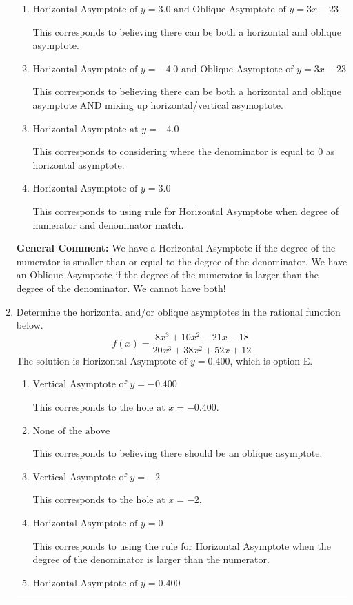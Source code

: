 \documentclass{extbook}[14pt]
\newcommand{\litem}[1]{\item #1

\rule{\textwidth}{0.4pt}}
\begin{document}
\begin{enumerate}
{\begin{enumerate}[label=\Alph*.]
This is the correct answer.
\item \( \text{Horizontal Asymptote of } y = 3.0 \text{ and Oblique Asymptote of } y = 3x -23 \)

This corresponds to believing there can be both a horizontal and oblique asymptote.
\item \( \text{Horizontal Asymptote of } y = -4.0 \text{ and Oblique Asymptote of } y = 3x -23 \)

This corresponds to believing there can be both a horizontal and oblique asymptote AND mixing up horizontal/vertical asymoptote.
\item \( \text{Horizontal Asymptote at } y = -4.0 \)

This corresponds to considering where the denominator is equal to 0 as horizontal asymptote.
\item \( \text{Horizontal Asymptote of } y = 3.0  \)

This corresponds to using rule for Horizontal Asymptote when degree of numerator and denominator match.
\end{enumerate}

\textbf{General Comment:} We have a Horizontal Asymptote if the degree of the numerator is smaller than or equal to the degree of the denominator. We have an Oblique Asymptote if the degree of the numerator is larger than the degree of the denominator. We cannot have both!
}
\litem{
Determine the horizontal and/or oblique asymptotes in the rational function below.
\[ f(x) = \frac{8x^{3} +10 x^{2} -21 x -18}{20x^{3} +38 x^{2} +52 x + 12} \]The solution is \( \text{Horizontal Asymptote of } y = 0.400  \), which is option E.\begin{enumerate}[label=\Alph*.]
\item \( \text{Vertical Asymptote of } y = -0.400  \)

This corresponds to the hole at $x = -0.400$.
\item \( \text{None of the above} \)

This corresponds to believing there should be an oblique asymptote.
\item \( \text{Vertical Asymptote of } y = -2  \)

This corresponds to the hole at $x = -2$.
\item \( \text{Horizontal Asymptote of } y = 0  \)

This corresponds to using the rule for Horizontal Asymptote when the degree of the denominator is larger than the numerator.
\item \( \text{Horizontal Asymptote of } y = 0.400  \)


\end{enumerate}}
\end{enumerate}
\end{document}
